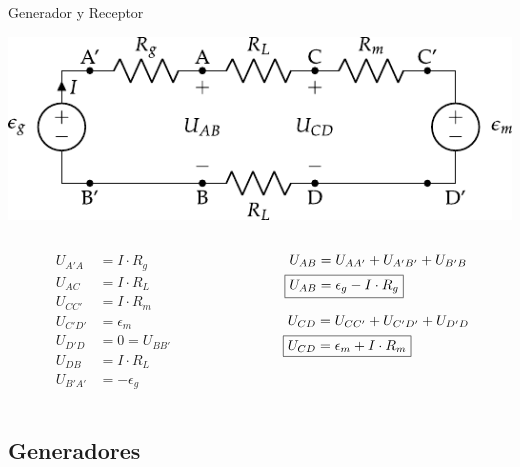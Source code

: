 \documentclass[aspectratio=169, usenames,svgnames,dvipsnames]{beamer}
\begin{document}
\begin{frame}[label={sec:orge000448}]{Generador y Receptor}
\begin{center}
\includegraphics[height=0.25\textheight]{../figs/circuito_lkv.pdf}
\end{center}

\begin{columns}
\begin{column}{0.3\columnwidth}
\begin{align*}
  U_{A'A} &= I \cdot R_g\\
  U_{AC} &= I \cdot R_L\\
  U_{CC'} &= I \cdot R_m\\
  U_{C'D'} &= \epsilon_m\\
  U_{D'D} &= 0 = U_{BB'}\\
  U_{DB} &= I \cdot R_L\\
  U_{B'A'} &= -\epsilon_g
\end{align*}
\end{column}
\begin{column}{0.7\columnwidth}
\begin{align*}
  U_{AB} &= U_{AA'} + U_{A'B'} + U_{B'B}\\
  \Aboxed{U_{AB} &= \epsilon_g - I \cdot R_g}
\end{align*}

\begin{align*}
  U_{CD} &= U_{CC'} + U_{C'D'} + U_{D'D}\\
  \Aboxed{U_{CD} &= \epsilon_m + I\cdot R_m}
\end{align*}
\end{column}
\end{columns}
\end{frame}
\subsection{Generadores}
\label{sec:orgeb1c434}
\end{document}
